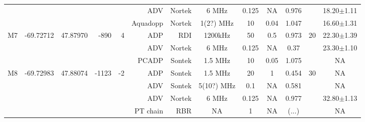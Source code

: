 \begin{sidewaystable}
\begin{tabular}{|r|c|c|r|r|r|r|c|c|c|c|c|c|}
    ~                   &                            &                           &                        &                       & ADV          & Nortek     & 6 MHz     & 0.125     & NA       & 0.976      &                    &  18.20$\pm$1.11   \\ %
    ~                   &                            &                           &                        &                       & Aquadopp     & Nortek     & 1(2?) MHz & 10        & 0.04     & 1.047      &                    &  16.60$\pm$1.31   \\\hline
    \multirow{3}{*}{M7} & \multirow{3}{*}{-69.72712} & \multirow{3}{*}{47.87970} & \multirow{3}{*}{-890}  & \multirow{3}{*}{4}    & ADP          & RDI        & 1200kHz   & 50        & 0.5      & 0.973      & \multirow{3}{*}{20}&  22.30$\pm$1.39   \\ 
    ~                   &                            &                           &                        &                       & ADV          & Nortek     & 6 MHz     & 0.125     & NA       & 0.37       &                    &  23.30$\pm$1.10   \\ %
    ~                   &                            &                           &                        &                       & PCADP        & Sontek     & 1.5 MHz   & 10        & 0.05     & 1.075      &                    &  NA               \\\hline
    \multirow{4}{*}{M8} & \multirow{4}{*}{-69.72983} & \multirow{4}{*}{47.88074} & \multirow{4}{*}{-1123} & \multirow{4}{*}{-2}   & ADP          & Sontek     & 1.5 MHz   & 20        & 1        & 0.454      & \multirow{4}{*}{30}&  NA               \\ 
    ~                   &                            &                           &                        &                       & ADV          & Sontek     & 5(10?) MHz& 0.1       & NA       & 0.581      &                    &  NA               \\ 
    ~                   &                            &                           &                        &                       & ADV          & Nortek     & 6 MHz     & 0.125     & NA       & 0.977      &                    &  32.80$\pm$1.13   \\ %
    ~                   &                            &                           &                        &                       & PT chain     & RBR        & NA        & 1         & NA       & (...)      &                    &  NA               \\\hline

\end{tabular}
\end{sidewaystable}
